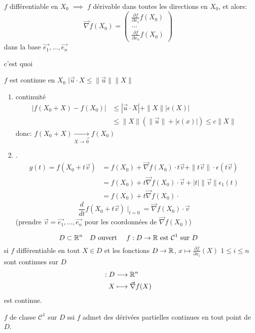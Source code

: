\begin{prop}
   $f$ différentiable en  $X_0$ $\implies$ $f$ dérivable dans toutes les directions en  $X_0$, et alors: 
   \[
       \vec{\nabla}f(X_0) = \begin{pmatrix} \frac{\partial f}{\partial x_1}f(X_0)\\ \ldots \\  \frac{\partial f}{\partial x_n}f(X_0)\end{pmatrix} 
   \] 
   dans la base $\vec{e_1}, \ldots, \vec{e_n}$
\end{prop}

\begin{TODO}
   c'est quoi 
\end{TODO}
$f$ est continue en  $X_0$ $|\vec{u} \cdot X \le \|\vec{u}\| \|X\|$
\begin{enumerate}
    \item continuité
        \begin{align*}
            |f(X_0 + X) - f(X_0)| &\le |\vec{u} \cdot X| + \|X\| |\epsilon(X)|\\
                                  &\le \|X\|\left( \|\vec{u}\| + |\epsilon(x)|  \right) \le c\|X\|
        \end{align*}
        donc: $f(X_0 + X) \xrightarrow[X \to \vec{0}]{} f(X_0)$
    \item .
        \begin{align*}
            g(t) = f(X_0 + t \vec{v}) &= f(X_0) + \vec{\nabla}f(X_0) \cdot t \vec{v} + \|t \vec{v}\| \cdot \epsilon(t \vec{v})\\
                                      &= f(X_0) + t\vec{\nabla}f(X_0) \cdot \vec{v} + |t|\|\vec{v}\|\epsilon_1(t)\\
                                      &= f(X_0) + t\vec{\nabla }f(X_0)\cdot 
        \end{align*}
        \[
            \frac{d}{dt} f(X_0 + t\vec{v})\mid_{t = 0} = \vec{\nabla}f(X_0)\cdot \vec{v}
        \] 
        (prendre $\vec{v} = \vec{e_1}, \ldots, \vec{e_n}$ pour les coordonnées de $\vec{\nabla}f(X_0)$)
\end{enumerate}
\begin{definition}
    \[
        D \subset \mathbb{R}^n \quad D \text{ ouvert } \quad f: D \to \mathbb{R} \text{ est } \mathcal{C}^1 \text{ sur } D
    \] 
    si $f$ différentiable en tout  $X \in D$ et les fonctions  $D \to \mathbb{R}$, $x \mapsto \frac{\partial f}{\partial x_i}(X)$ $1 \le i \le n$ sont continues sur $D$
    \begin{align*}
        : D &\longrightarrow \mathbb{R}^n \\
        X &\longmapsto \vec{\nabla}f(X)
    \end{align*}
    est continue.
\end{definition}
\begin{theorem}
    $f$ de classe  $\mathcal{C}^1$ sur  $D$ ssi  $f$ admet des dérivées partielles continues en tout point de  $D$. 
\end{theorem}

